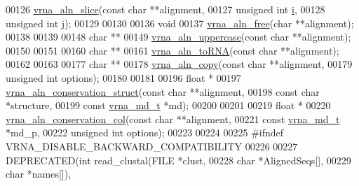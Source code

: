 \begin{DoxyCode}
00126 \hyperlink{group__aln__utils_gac801b0a72eac4ab9d5b2ef7533db9193}{vrna\_aln\_slice}(\textcolor{keyword}{const} \textcolor{keywordtype}{char}   **alignment,
00127                \textcolor{keywordtype}{unsigned} \textcolor{keywordtype}{int} \hyperlink{group__aln__utils_ab91db0a87ef8402dc151795ba5a64c6f}{i},
00128                \textcolor{keywordtype}{unsigned} \textcolor{keywordtype}{int} \hyperlink{group__aln__utils_a4142e38d6ba127acccdf680300a88e1f}{j});
00129 
00130 
00136 \textcolor{keywordtype}{void}
00137 \hyperlink{group__aln__utils_gac00dc80b8a324f151f92f11ab6850ecf}{vrna\_aln\_free}(\textcolor{keywordtype}{char} **alignment);
00138 
00139 
00148 \textcolor{keywordtype}{char} **
00149 \hyperlink{group__aln__utils_ga3a0476a71c4bae3d302790de58055704}{vrna\_aln\_uppercase}(\textcolor{keyword}{const} \textcolor{keywordtype}{char} **alignment);
00150 
00151 
00160 \textcolor{keywordtype}{char} **
00161 \hyperlink{group__aln__utils_ga7886fc678553c06472a712a335cde9cf}{vrna\_aln\_toRNA}(\textcolor{keyword}{const} \textcolor{keywordtype}{char} **alignment);
00162 
00163 
00177 \textcolor{keywordtype}{char} **
00178 \hyperlink{group__aln__utils_ga08cdca592461436860daf9738279ce17}{vrna\_aln\_copy}(\textcolor{keyword}{const} \textcolor{keywordtype}{char}    **alignment,
00179               \textcolor{keywordtype}{unsigned} \textcolor{keywordtype}{int}  options);
00180 
00181 
00196 \textcolor{keywordtype}{float} *
00197 \hyperlink{group__aln__utils_gab6f16a2ea93f3bfd4d089cc8d448bb16}{vrna\_aln\_conservation\_struct}(\textcolor{keyword}{const} \textcolor{keywordtype}{char}       **alignment,
00198                              \textcolor{keyword}{const} \textcolor{keywordtype}{char}       *structure,
00199                              \textcolor{keyword}{const} \hyperlink{group__model__details_structvrna__md__s}{vrna\_md\_t}  *md);
00200 
00201 
00219 \textcolor{keywordtype}{float} *
00220 \hyperlink{group__aln__utils_gaa12b481a7e7b965ef2eb1bcc4399e759}{vrna\_aln\_conservation\_col}(\textcolor{keyword}{const} \textcolor{keywordtype}{char}      **alignment,
00221                           \textcolor{keyword}{const} \hyperlink{group__model__details_structvrna__md__s}{vrna\_md\_t} *md\_p,
00222                           \textcolor{keywordtype}{unsigned} \textcolor{keywordtype}{int}    options);
00223 
00224 
00225 \textcolor{preprocessor}{#ifndef VRNA\_DISABLE\_BACKWARD\_COMPATIBILITY}
00226 
00227 DEPRECATED(\textcolor{keywordtype}{int} read\_clustal(FILE  *clust,
00228                             \textcolor{keywordtype}{char}  *AlignedSeqs[],
00229                             \textcolor{keywordtype}{char}  *names[]),

\end{DoxyCode}
